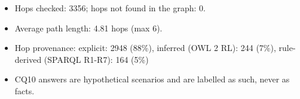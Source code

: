 \begin{itemize}\setlength\itemsep{1pt}
\item Hops checked: 3356; hops not found in the graph: 0.
\item Average path length: 4.81 hops (max 6).
\item Hop provenance: explicit: 2948 (88\%), inferred (OWL 2 RL): 244 (7\%), rule-derived (SPARQL R1-R7): 164 (5\%)
\item CQ10 answers are hypothetical scenarios and are labelled as such, never as facts.
\end{itemize}
